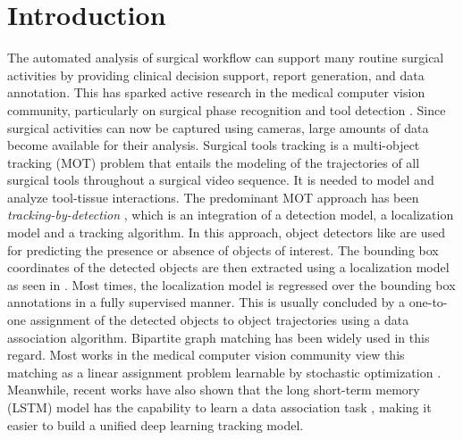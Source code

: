 \documentclass{svjour3}                     \smartqed
\begin{document}
\section{Introduction}
\label{sec:introduction}
The automated analysis of surgical workflow can support many routine surgical activities by providing clinical decision support, report generation, and data annotation.
This has sparked active research in the medical computer vision community, particularly on surgical phase recognition \cite{tmi:twinanda2017endonet,ipcai:zisimopoulos2018deepphase} and tool detection \cite{ipcai:richa2011visual,miccai:sznitman2014fast,miccai:vardazaryan2018weakly,miccai:sznitman2011unified,mai:al2018monitoring,wacv:jin2018tool}.
Since surgical activities can now be captured using cameras, large amounts of data become available for their analysis. 
Surgical tools tracking is a multi-object tracking (MOT) problem that entails the modeling of the trajectories of all surgical tools throughout a surgical video sequence.
It is needed to model and analyze tool-tissue interactions.
The predominant MOT approach has been \textit{tracking-by-detection} \cite{ipcai:richa2011visual,iccv:singh2017hide,lstm_da:milan2017online}, which is an integration of a detection model, a localization model and a tracking algorithm. 
In this approach, object detectors like \cite{cvpr:he2016deep} are used for predicting the presence or absence of objects of interest. 
The bounding box coordinates of the detected objects are then extracted using a localization model as seen in \cite{miccai:vardazaryan2018weakly,wacv:jin2018tool}. 
Most times, the localization model is regressed over the bounding box annotations in a fully supervised manner. 
This is usually concluded by a one-to-one assignment of the detected objects to object trajectories using a data association algorithm. 
Bipartite graph matching \cite{hungarian:kuhn1955hungarian} has been widely used in this regard. 
Most works in the medical computer vision community view this matching as a linear assignment problem learnable by stochastic optimization \cite{ipcai:richa2011visual,miccai:sznitman2014fast,miccai:sznitman2011unified,cvpr:mishra2017learning}.
Meanwhile, recent works have also shown that the long short-term memory (LSTM) model has the capability to learn a data association task \cite{lstm_da:milan2017online}, making it easier to build a unified deep learning tracking model.
\end{document}
